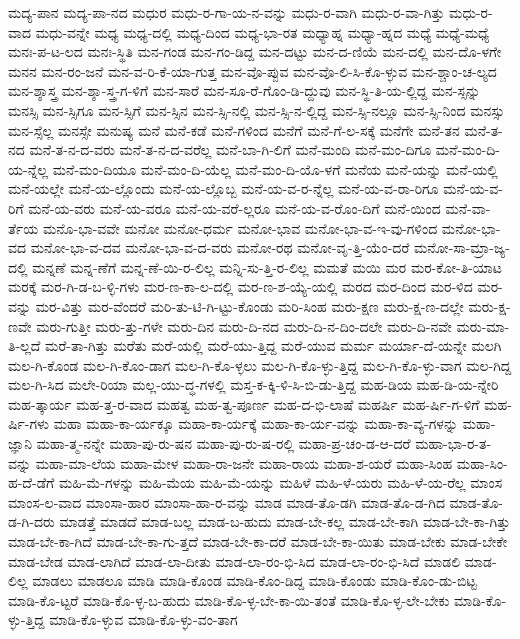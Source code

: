 {ಮದ್ಯ-ಪಾನ
ಮದ್ಯ-ಪಾ-ನದ
ಮಧುರ
ಮಧು-ರ-ಗಾ-ಯ-ನ-ವನ್ನು
ಮಧು-ರ-ವಾಗಿ
ಮಧು-ರ-ವಾ-ಗಿತ್ತು
ಮಧು-ರ-ವಾದ
ಮಧು-ವನ್ನೇ
ಮಧ್ಯ
ಮಧ್ಯ-ದಲ್ಲಿ
ಮಧ್ಯ-ದಿಂದ
ಮಧ್ಯ-ಭಾ-ರತ
ಮಧ್ಯಾಹ್ನ
ಮಧ್ಯಾ-ಹ್ನದ
ಮಧ್ಯೆ
ಮಧ್ಯೆ-ಮಧ್ಯೆ
ಮನಃ-ಪ-ಟ-ಲದ
ಮನಃ-ಸ್ಥಿತಿ
ಮನ-ಗಂಡ
ಮನ-ಗಂ-ಡಿದ್ದ
ಮನ-ದಟ್ಟು
ಮನ-ದ-ಣಿಯೆ
ಮನ-ದಲ್ಲಿ
ಮನ-ದೊ-ಳಗೇ
ಮನನ
ಮನ-ರಂ-ಜನೆ
ಮನ-ವ-ರಿ-ಕೆ-ಯಾ-ಗುತ್ತ
ಮನ-ವೊ-ಪ್ಪುವ
ಮನ-ವೊ-ಲಿ-ಸಿ-ಕೊ-ಳ್ಳುವ
ಮನ-ಶ್ಚಾಂ-ಚ-ಲ್ಯದ
ಮನ-ಶ್ಶಾಸ್ತ್ರ
ಮನ-ಶ್ಶಾ-ಸ್ತ್ರ-ಗ-ಳಿಗೆ
ಮನ-ಸಾರೆ
ಮನ-ಸೂ-ರೆ-ಗೊಂ-ಡಿ-ದ್ದುವು
ಮನ-ಸ್ಥಿ-ತಿ-ಯ-ಲ್ಲಿದ್ದ
ಮನ-ಸ್ಸನ್ನು
ಮನಸ್ಸಿ
ಮನ-ಸ್ಸಿಗೂ
ಮನ-ಸ್ಸಿಗೆ
ಮನ-ಸ್ಸಿನ
ಮನ-ಸ್ಸಿ-ನಲ್ಲಿ
ಮನ-ಸ್ಸಿ-ನ-ಲ್ಲಿದ್ದ
ಮನ-ಸ್ಸಿ-ನಲ್ಲೂ
ಮನ-ಸ್ಸಿ-ನಿಂದ
ಮನಸ್ಸು
ಮನ-ಸ್ಸೆಲ್ಲ
ಮನಸ್ಸೇ
ಮನುಷ್ಯ
ಮನೆ
ಮನೆ-ಕಡೆ
ಮನೆ-ಗಳಿಂದ
ಮನೆಗೆ
ಮನೆ-ಗೆ-ಲ-ಸಕ್ಕೆ
ಮನೆಗೇ
ಮನೆ-ತನ
ಮನೆ-ತ-ನದ
ಮನೆ-ತ-ನ-ದ-ವರು
ಮನೆ-ತ-ನ-ದ-ವರೆಲ್ಲ
ಮನೆ-ಬಾ-ಗಿ-ಲಿಗೆ
ಮನೆ-ಮಂದಿ
ಮನೆ-ಮಂ-ದಿಗೂ
ಮನೆ-ಮಂ-ದಿ-ಯ-ನ್ನೆಲ್ಲ
ಮನೆ-ಮಂ-ದಿಯೂ
ಮನೆ-ಮಂ-ದಿ-ಯೆಲ್ಲ
ಮನೆ-ಮಂ-ದಿ-ಯೊ-ಳಗೆ
ಮನೆಯ
ಮನೆ-ಯನ್ನು
ಮನೆ-ಯಲ್ಲಿ
ಮನೆ-ಯಲ್ಲೇ
ಮನೆ-ಯ-ಲ್ಲೊಂದು
ಮನೆ-ಯ-ಲ್ಲೊಬ್ಬ
ಮನೆ-ಯ-ವ-ರ-ನ್ನೆಲ್ಲ
ಮನೆ-ಯ-ವ-ರಾ-ರಿಗೂ
ಮನೆ-ಯ-ವ-ರಿಗೆ
ಮನೆ-ಯ-ವರು
ಮನೆ-ಯ-ವರೂ
ಮನೆ-ಯ-ವರೆ-ಲ್ಲರೂ
ಮನೆ-ಯ-ವ-ರೊಂ-ದಿಗೆ
ಮನೆ-ಯಿಂದ
ಮನೆ-ವಾ-ರ್ತೆಯ
ಮನೊ-ಭಾ-ವವೇ
ಮನೋ
ಮನೋ-ಧರ್ಮ
ಮನೋ-ಭಾವ
ಮನೋ-ಭಾ-ವ-ಇ-ವು-ಗಳಿಂದ
ಮನೋ-ಭಾ-ವದ
ಮನೋ-ಭಾ-ವ-ದವ
ಮನೋ-ಭಾ-ವ-ದ-ವರು
ಮನೋ-ರಥ
ಮನೋ-ವೃ-ತ್ತಿ-ಯೆಂ-ದರೆ
ಮನೋ-ಸಾ-ಮ್ರಾ-ಜ್ಯ-ದಲ್ಲಿ
ಮನ್ನಣೆ
ಮನ್ನ-ಣೆಗೆ
ಮನ್ನ-ಣೆ-ಯಿ-ರ-ಲಿಲ್ಲ
ಮನ್ನಿ-ಸು-ತ್ತಿ-ರ-ಲಿಲ್ಲ
ಮಮತೆ
ಮಯಿ
ಮರ
ಮರ-ಕೋ-ತಿ-ಯಾಟ
ಮರಕ್ಕೆ
ಮರ-ಗಿ-ಡ-ಬ-ಳ್ಳಿ-ಗಳು
ಮರ-ಣ-ಕಾ-ಲ-ದಲ್ಲಿ
ಮರ-ಣ-ಶ-ಯ್ಯೆ-ಯಲ್ಲಿ
ಮರದ
ಮರ-ದಿಂದ
ಮರ-ಳಿದ
ಮರ-ವನ್ನು
ಮರ-ವಿತ್ತು
ಮರ-ವೆಂದರೆ
ಮರಿ-ತು-ಟಿ-ಗಿ-ಟ್ಟು-ಕೊಂಡು
ಮರಿ-ಸಿಂಹ
ಮರು-ಕ್ಷಣ
ಮರು-ಕ್ಷ-ಣ-ದಲ್ಲೇ
ಮರು-ಕ್ಷ-ಣವೇ
ಮರು-ಗುತ್ತೀ
ಮರು-ತ್ತು-ಗಳೇ
ಮರು-ದಿನ
ಮರು-ದಿ-ನದ
ಮರು-ದಿ-ನ-ದಿಂ-ದಲೇ
ಮರು-ದಿ-ನವೇ
ಮರು-ಮಾ-ತಿ-ಲ್ಲದೆ
ಮರೆ-ತಾ-ಗಿತ್ತು
ಮರೆತು
ಮರೆ-ಯಲ್ಲಿ
ಮರೆ-ಯು-ತ್ತಿದ್ದ
ಮರೆ-ಯುವ
ಮರ್ಮ
ಮರ್ಯಾ-ದೆ-ಯನ್ನೇ
ಮಲಗಿ
ಮಲ-ಗಿ-ಕೊಂಡ
ಮಲ-ಗಿ-ಕೊಂ-ಡಾಗ
ಮಲ-ಗಿ-ಕೊ-ಳ್ಳಲು
ಮಲ-ಗಿ-ಕೊ-ಳ್ಳು-ತ್ತಿದ್ದ
ಮಲ-ಗಿ-ಕೊ-ಳ್ಳು-ವಾಗ
ಮಲ-ಗಿದ್ದ
ಮಲ-ಗಿ-ಸಿದ
ಮಲೇ-ರಿಯಾ
ಮಲ್ಲ-ಯು-ದ್ಧ-ಗಳಲ್ಲಿ
ಮಸ್ತ-ಕ-ಕ್ಕಿ-ಳಿ-ಸಿ-ಬಿ-ಡು-ತ್ತಿದ್ದ
ಮಹ-ಡಿಯ
ಮಹ-ಡಿ-ಯ-ನ್ನೇರಿ
ಮಹ-ತ್ಕಾರ್ಯ
ಮಹ-ತ್ತ-ರ-ವಾದ
ಮಹತ್ವ
ಮಹ-ತ್ವ-ಪೂರ್ಣ
ಮಹ-ದ-ಭಿ-ಲಾಷೆ
ಮಹರ್ಷಿ
ಮಹ-ರ್ಷಿ-ಗ-ಳಿಗೆ
ಮಹ-ರ್ಷಿ-ಗಳು
ಮಹಾ
ಮಹಾ-ಕಾ-ರ್ಯಕ್ಕೂ
ಮಹಾ-ಕಾ-ರ್ಯಕ್ಕೆ
ಮಹಾ-ಕಾ-ರ್ಯ-ವನ್ನು
ಮಹಾ-ಕಾ-ವ್ಯ-ಗಳನ್ನು
ಮಹಾ-ಜ್ಞಾನಿ
ಮಹಾ-ತ್ಮ-ನನ್ನೇ
ಮಹಾ-ಪು-ರು-ಷನ
ಮಹಾ-ಪು-ರು-ಷ-ರಲ್ಲಿ
ಮಹಾ-ಪ್ರ-ಚಂ-ಡ-ಆ-ದರೆ
ಮಹಾ-ಭಾ-ರ-ತ-ವನ್ನು
ಮಹಾ-ಮಾ-ಲೆಯ
ಮಹಾ-ಮೇಳ
ಮಹಾ-ರಾ-ಜನೇ
ಮಹಾ-ರಾಯ
ಮಹಾ-ಶ-ಯರೆ
ಮಹಾ-ಸಿಂಹ
ಮಹಾ-ಸಿಂ-ಹ-ದೆ-ಡೆಗೆ
ಮಹಿ-ಮೆ-ಗಳನ್ನು
ಮಹಿ-ಮೆಯ
ಮಹಿ-ಮೆ-ಯನ್ನು
ಮಹಿಳೆ
ಮಹಿ-ಳೆ-ಯರು
ಮಹಿ-ಳೆ-ಯ-ರೆಲ್ಲ
ಮಾಂಸ
ಮಾಂಸ-ಲ-ವಾದ
ಮಾಂಸಾ-ಹಾರ
ಮಾಂಸಾ-ಹಾ-ರ-ವನ್ನು
ಮಾಡ
ಮಾಡ-ತೊ-ಡಗಿ
ಮಾಡ-ತೊ-ಡ-ಗಿದ
ಮಾಡ-ತೊ-ಡ-ಗಿ-ದರು
ಮಾಡತ್ತೆ
ಮಾಡದೆ
ಮಾಡ-ಬಲ್ಲ
ಮಾಡ-ಬ-ಹುದು
ಮಾಡ-ಬೇ-ಕಲ್ಲ
ಮಾಡ-ಬೇ-ಕಾಗಿ
ಮಾಡ-ಬೇ-ಕಾ-ಗಿತ್ತು
ಮಾಡ-ಬೇ-ಕಾ-ಗಿದೆ
ಮಾಡ-ಬೇ-ಕಾ-ಗು-ತ್ತದೆ
ಮಾಡ-ಬೇ-ಕಾ-ದರೆ
ಮಾಡ-ಬೇ-ಕಾ-ಯಿತು
ಮಾಡ-ಬೇಕು
ಮಾಡ-ಬೇಕೇ
ಮಾಡ-ಬೇಡ
ಮಾಡ-ಲಾಗಿದೆ
ಮಾಡ-ಲಾ-ದೀತು
ಮಾಡ-ಲಾ-ರಂ-ಭಿ-ಸಿದ
ಮಾಡ-ಲಾ-ರಂ-ಭಿ-ಸಿದೆ
ಮಾಡಲಿ
ಮಾಡ-ಲಿಲ್ಲ
ಮಾಡಲು
ಮಾಡಲೂ
ಮಾಡಿ
ಮಾಡಿ-ಕೊಂಡ
ಮಾಡಿ-ಕೊಂ-ಡಿದ್ದ
ಮಾಡಿ-ಕೊಂಡು
ಮಾಡಿ-ಕೊಂ-ಡು-ಬಿಟ್ಟ
ಮಾಡಿ-ಕೊ-ಟ್ಟರೆ
ಮಾಡಿ-ಕೊ-ಳ್ಳ-ಬ-ಹುದು
ಮಾಡಿ-ಕೊ-ಳ್ಳ-ಬೇ-ಕಾ-ಯಿ-ತಂತೆ
ಮಾಡಿ-ಕೊ-ಳ್ಳ-ಲೇ-ಬೇಕು
ಮಾಡಿ-ಕೊ-ಳ್ಳು-ತ್ತಿದ್ದ
ಮಾಡಿ-ಕೊ-ಳ್ಳುವ
ಮಾಡಿ-ಕೊ-ಳ್ಳು-ವಂ-ತಾಗ
}
